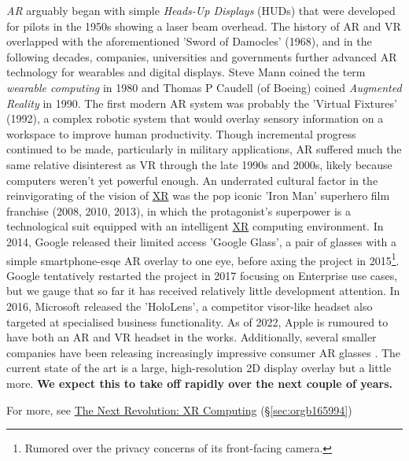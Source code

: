 \documentclass[logo,bsc,singlespacing,parskip]{infthesis}
\begin{document}
\emph{AR} arguably began with simple \emph{Heads-Up Displays} (HUDs) that were developed for pilots in the 1950s showing a laser beam overhead.
The history of AR and VR overlapped with the aforementioned 'Sword of Damocles' (1968), and in the following decades, companies, universities and governments further advanced AR technology for wearables and digital displays.
Steve Mann coined the term \emph{wearable computing} in 1980 and Thomas P Caudell (of Boeing) coined \emph{Augmented Reality} in 1990.
The first modern AR system was probably the 'Virtual Fixtures' (1992), a complex robotic system that would overlay sensory information on a workspace to improve human productivity.
Though incremental progress continued to be made, particularly in military applications, AR suffered much the same relative disinterest as VR through the late 1990s and 2000s, likely because computers weren't yet powerful enough.
An underrated cultural factor in the reinvigorating of the vision of \hyperref[org39cbd51]{XR} was the pop iconic 'Iron Man' superhero film franchise (2008, 2010, 2013),  in which the protagonist's superpower is a technological suit equipped with an intelligent \hyperref[org39cbd51]{XR} computing environment.
In 2014, Google released their limited access 'Google Glass', a pair of glasses with a simple smartphone-esqe AR overlay to one eye, before axing the project in 2015\footnote{Rumored over the privacy concerns of its front-facing camera.}.
Google tentatively restarted the project in 2017 focusing on Enterprise use cases, but we gauge that so far it has received relatively little development attention.
In 2016, Microsoft released the 'HoloLens', a competitor visor-like headset also targeted at specialised business functionality.
As of 2022, Apple is rumoured to have both an AR and VR headset in the works.
Additionally, several smaller companies have been releasing increasingly impressive consumer AR glasses \autocites{NrealAir}[][]{INMOAIRWorld}[][]{VuzixBladeUpgraded}.
The current state of the art is a large, high-resolution 2D display overlay but a little more.
\textbf{We expect this to take off rapidly over the next couple of years.}

For more, see \hyperref[sec:orgb165994]{The Next Revolution: XR Computing} (\S \ref{sec:orgb165994})
\end{document}
